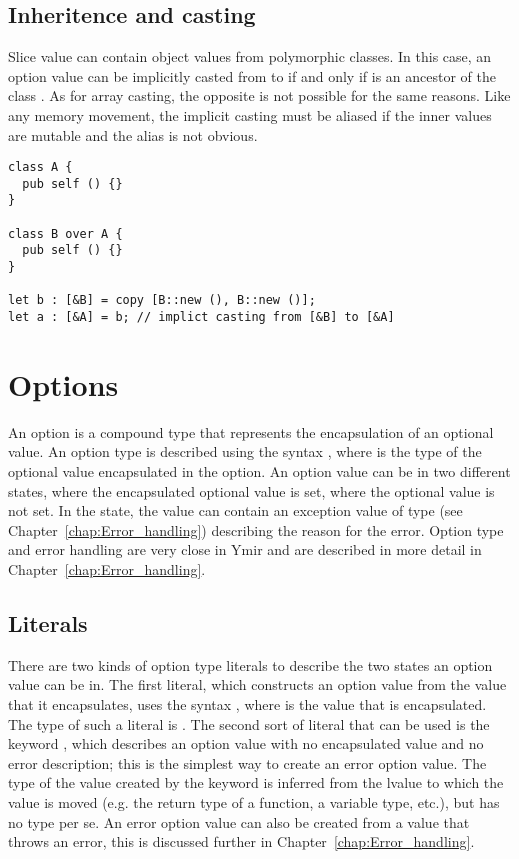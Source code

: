 \subsection{Inheritence and casting}

Slice value can contain object values from polymorphic classes. In this case, an
option value can be implicitly casted from \token{[B]} to \token{[A]} if and
only if  is an ancestor of the class . As for array casting,
the opposite is not possible for the same reasons. Like any memory movement, the
implicit casting must be aliased if the inner values are mutable and the alias
is not obvious.

\begin{lstlisting}[style=coloredverbatim]
class A {
  pub self () {}
}

class B over A {
  pub self () {}
}

let b : [&B] = copy [B::new (), B::new ()];
let a : [&A] = b; // implict casting from [&B] to [&A]
\end{lstlisting}

\section{Options}%
\label{sec:options}

An option is a compound type that represents the encapsulation of an optional
value. An option type is described using the syntax , where
 is the type of the optional value encapsulated in the option. An
option value can be in two different states,  where the encapsulated
optional value is set,  where the optional value is not set. In the
 state, the value can contain an exception value of type
 (see Chapter~\ref{chap:Error_handling}) describing the
reason for the error. Option type and error handling are very close in Ymir and
are described in more detail in Chapter~\ref{chap:Error_handling}.

\subsection{Literals}

There are two kinds of option type literals to describe the two states an option
value can be in. The first literal, which constructs an option value from the
value that it encapsulates, uses the syntax , where  is the
value that is encapsulated. The type of such a literal is .
The second sort of literal that can be used is the keyword , which
describes an option value with no encapsulated value and no error description;
this is the simplest way to create an error option value. The type of the value
created by the keyword  is inferred from the lvalue to which the
value is moved (e.g. the return type of a function, a variable type, etc.), but
has no type per se. An error option value can also be created from a value that
throws an error, this is discussed further in Chapter~\ref{chap:Error_handling}.


